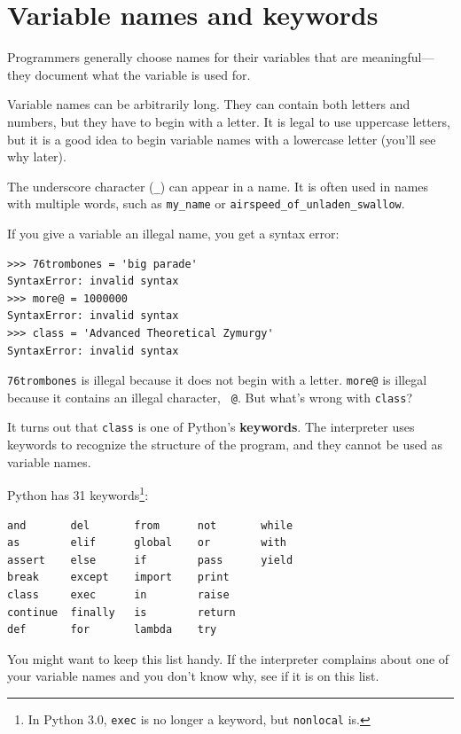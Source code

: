 \documentclass[10pt]{book}
\begin{document}
\section{Variable names and keywords}

Programmers generally choose names for their variables that
are meaningful---they document what the variable is used for.

Variable names can be arbitrarily long.  They can contain
both letters and numbers, but they have to begin with a letter.
It is legal to use uppercase letters, but it is a good idea
to begin variable names with a lowercase letter (you'll
see why later).

The underscore character (\verb"_") can appear in a name.
It is often used in names with multiple words, such as
\verb"my_name" or \verb"airspeed_of_unladen_swallow".


If you give a variable an illegal name, you get a syntax error:

\beforeverb
\begin{verbatim}
>>> 76trombones = 'big parade'
SyntaxError: invalid syntax
>>> more@ = 1000000
SyntaxError: invalid syntax
>>> class = 'Advanced Theoretical Zymurgy'
SyntaxError: invalid syntax
\end{verbatim}
\afterverb
%
{\tt 76trombones} is illegal because it does not begin with a letter.
{\tt more@} is illegal because it contains an illegal character, {\tt
@}.  But what's wrong with {\tt class}?

It turns out that {\tt class} is one of Python's {\bf keywords}.  The
interpreter uses keywords to recognize the structure of the program,
and they cannot be used as variable names.


Python has 31 keywords\footnote{In Python 3.0, {\tt exec} is no
longer a keyword, but {\tt nonlocal} is.}:

\beforeverb
\begin{verbatim}
and       del       from      not       while    
as        elif      global    or        with     
assert    else      if        pass      yield    
break     except    import    print              
class     exec      in        raise              
continue  finally   is        return             
def       for       lambda    try
\end{verbatim}
\afterverb
%
You might want to keep this list handy.  If the interpreter complains
about one of your variable names and you don't know why, see if it
is on this list.
\end{document}
